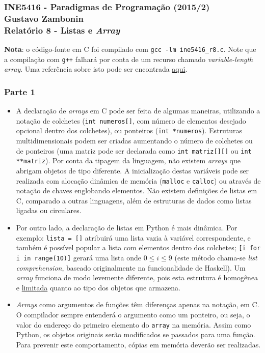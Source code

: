 \documentclass{article}
\begin{document}
\subsubsection*{INE5416 - Paradigmas de Programação (2015/2) \\
    Gustavo Zambonin \\
    Relatório 8 - Listas e \textit{Array}
}

\textbf{Nota}: o código-fonte em C foi compilado com
\texttt{gcc -lm ine5416\_r8.c}. Note que a compilação com \texttt{g++} falhará
por conta de um recurso chamado \textit{variable-length array}. Uma referência
sobre isto pode ser encontrada \href{http://stackoverflow.com/a/25552114}{aqui}.

\subsubsection*{Parte 1}
\begin{itemize}
    \item A declaração de \textit{arrays} em C pode ser feita de algumas
    maneiras, utilizando a notação de colchetes (\texttt{int numeros[]}, com
    número de elementos desejado opcional dentro dos colchetes), ou ponteiros
    (\texttt{int *numeros}). Estruturas multidimensionais podem ser criadas
    aumentando o número de colchetes ou de ponteiros (uma matriz pode ser
    declarada como \texttt{int matriz[][]} ou \texttt{int **matriz}). Por conta
    da tipagem da linguagem, não existem \textit{arrays} que abrigam objetos
    de tipo diferente. A inicialização destas variáveis pode ser realizada
    com alocação dinâmica de memória (\texttt{malloc} e \texttt{calloc}) ou
    através de notação de chaves englobando elementos. Não existem definições
    de listas em C, comparado a outras linguagens, além de estruturas de dados
    como listas ligadas ou circulares.

    \item Por outro lado, a declaração de listas em Python é mais dinâmica.
    Por exemplo: \texttt{lista = []} atribuirá uma lista vazia à variável
    correspondente, e também é possível popular a lista com elementos dentro
    dos colchetes; \texttt{[i for i in range(10)]} gerará uma lista onde
    $0 \leq i \leq 9$ (este método chama-se \textit{list comprehension},
    baseado originalmente na funcionalidade de Haskell). Um \textit{array}
    funciona de modo levemente diferente, pois esta estrutura é homogênea
    e \href{https://docs.python.org/2/library/array.html}{limitada} quanto ao
    tipo dos objetos que armazena.

    \item \textit{Arrays} como argumentos de funções têm diferenças apenas
    na notação, em C. O compilador sempre entenderá o argumento como um
    ponteiro, ou seja, o valor do endereço do primeiro elemento do
    \texttt{array} na memória. Assim como Python, os objetos originais serão
    modificados se passados para uma função. Para prevenir este comportamento,
    cópias em memória deverão ser realizadas.
\end{itemize}
\end{document}
